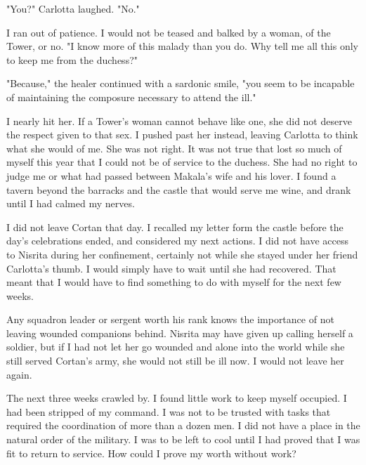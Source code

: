 \documentclass{article}
\begin{document}
"You?" Carlotta laughed. "No."

I ran out of patience. I would not be teased and balked by a woman, of the Tower, or no.  "I know more of this malady than you do. Why tell me all this only to keep me from the duchess?"

"Because," the healer continued with a sardonic smile, "you seem to be incapable of maintaining the composure necessary to attend the ill."

I nearly hit her. If a Tower's woman cannot behave like one, she did not deserve the respect given to that sex. I pushed past her instead, leaving Carlotta to think what she would of me. She was not right. It was not true that lost so much of myself this year that I could not be of service to the duchess. She had no right to judge me or what had passed between Makala's wife and his lover. I found a tavern beyond the barracks and the castle that would serve me wine, and drank until I had calmed my nerves. 

I did not leave Cortan that day. I recalled my letter form the castle before the day's celebrations ended, and considered my next actions. I did not have access to Nisrita during her confinement, certainly not while she stayed under her friend Carlotta's thumb. I would simply have to wait until she had recovered. That meant that I would have to find something to do with myself for the next few weeks. 

Any squadron leader or sergent worth his rank knows the importance of not leaving wounded companions behind. Nisrita may have given up calling herself a soldier, but if I had not let her go wounded and alone into the world while she still served Cortan's army, she would not still be ill now. I would not leave her again.

\vspace{.5 cm}


The next three weeks crawled by. I found little work to keep myself occupied. I had been stripped of my command. I was not to be trusted with tasks that required the coordination of more than a dozen men. I did not have a place in the natural order of the military. I was to be left to cool until I had proved that I was fit to return to service. How could I prove my worth without work? 
\end{document}
